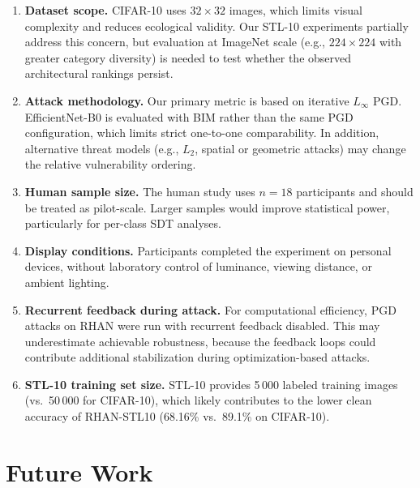 \documentclass[12pt,a4paper]{article}
\begin{document}
\begin{enumerate}[leftmargin=1.5em]
  \item \textbf{Dataset scope.} CIFAR-10 uses $32{\times}32$ images, which limits
        visual complexity and reduces ecological validity. Our STL-10 experiments
        partially address this concern, but evaluation at ImageNet scale
        (e.g., $224{\times}224$ with greater category diversity) is needed to test
        whether the observed architectural rankings persist.
  \item \textbf{Attack methodology.} Our primary metric is based on iterative
        $L_\infty$ PGD. EfficientNet-B0 is evaluated with BIM rather than the same
        PGD configuration, which limits strict one-to-one comparability. In
        addition, alternative threat models (e.g., $L_2$, spatial or geometric
        attacks) may change the relative vulnerability ordering.
  \item \textbf{Human sample size.} The human study uses $n{=}18$ participants and
        should be treated as pilot-scale. Larger samples would improve
        statistical power, particularly for per-class SDT analyses.
  \item \textbf{Display conditions.} Participants completed the experiment on
        personal devices, without laboratory control of luminance, viewing
        distance, or ambient lighting.
  \item \textbf{Recurrent feedback during attack.} For computational efficiency,
        PGD attacks on RHAN were run with recurrent feedback disabled. This may
        underestimate achievable robustness, because the feedback loops could
        contribute additional stabilization during optimization-based attacks.
  \item \textbf{STL-10 training set size.} STL-10 provides 5\,000 labeled training
        images (vs.\ 50\,000 for CIFAR-10), which likely contributes to the lower
        clean accuracy of RHAN-STL10 (68.16\% vs.\ 89.1\% on CIFAR-10).
\end{enumerate}

\section{Future Work}
\label{sec:future}
\end{document}
